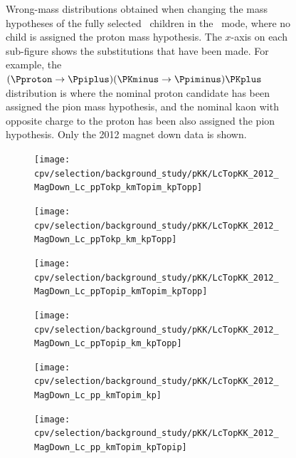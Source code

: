 \begin{figure}
  \caption{%
    Wrong-mass distributions obtained when changing the mass hypotheses of the 
    fully selected \PLambdac\ children in the \pKK\ mode, where no child is 
    assigned the proton mass hypothesis.
    The $x$-axis on each sub-figure shows the substitutions that have been 
    made.
    For example, the ${(\Pproton \to \Ppiplus)(\PKminus \to \Ppiminus)\PKplus}$ distribution is 
    where the nominal proton candidate has been assigned the pion mass 
    hypothesis, and the nominal kaon with opposite charge to the proton has 
    been also assigned the pion hypothesis.
    Only the 2012 magnet down data is shown.
  }
  \label{fig:cpv:selection:background_study:pKK_meson}
\end{figure}


\begin{figure}
  \begin{subfigure}[b]{0.3\textwidth}
    \texttt{[image: cpv/selection/background\_study/pKK/LcTopKK\_2012\_MagDown\_Lc\_ppTokp\_kmTopim\_kpTopp]}
    \caption{\decay{\PLambdac}{\PKplus\Ppiminus\Pproton}}
    \label{fig:cpv:selection:background_study:pKK_baryon:lcp_Kpip}
  \end{subfigure}
  \begin{subfigure}[b]{0.3\textwidth}
    \texttt{[image: cpv/selection/background\_study/pKK/LcTopKK\_2012\_MagDown\_Lc\_ppTokp\_km\_kpTopp]}
    \caption{\decay{\PLambdac}{\PKplus\PKminus\Pproton}}
    \label{fig:cpv:selection:background_study:pKK_baryon:lcp_KKp}
  \end{subfigure}
  \begin{subfigure}[b]{0.3\textwidth}
    \texttt{[image: cpv/selection/background\_study/pKK/LcTopKK\_2012\_MagDown\_Lc\_ppTopip\_kmTopim\_kpTopp]}
    \caption{\decay{\PLambdac}{\Ppiplus\Ppiminus\Pproton}}
    \label{fig:cpv:selection:background_study:pKK_baryon:lcp_pipip}
  \end{subfigure}

  \begin{subfigure}[b]{0.3\textwidth}
    \texttt{[image: cpv/selection/background\_study/pKK/LcTopKK\_2012\_MagDown\_Lc\_ppTopip\_km\_kpTopp]}
    \caption{\decay{\PLambdac}{\Ppiplus\PKminus\Pproton}}
    \label{fig:cpv:selection:background_study:pKK_baryon:lcp_pikp}
  \end{subfigure}
  \begin{subfigure}[b]{0.3\textwidth}
    \texttt{[image: cpv/selection/background\_study/pKK/LcTopKK\_2012\_MagDown\_Lc\_pp\_kmTopim\_kp]}
    \caption{\decay{\PLambdac}{\Pproton\Ppiminus\PKplus}}
    \label{fig:cpv:selection:background_study:pKK_baryon:lcp_ppik}
  \end{subfigure}
  \begin{subfigure}[b]{0.3\textwidth}
    \texttt{[image: cpv/selection/background\_study/pKK/LcTopKK\_2012\_MagDown\_Lc\_pp\_kmTopim\_kpTopip]}
    \caption{\decay{\PLambdac}{\Pproton\Ppiminus\Ppiplus}}
    \label{fig:cpv:selection:background_study:pKK_baryon:lcp_ppipi}
  \end{subfigure}


\end{figure}
